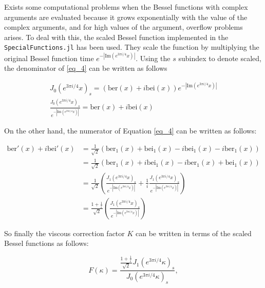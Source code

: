 \documentclass{article}[a4paper, 12pt]
\begin{document}
Exists some computational problems when the Bessel functions with complex arguments are evaluated because it grows exponentially with the value of the complex arguments, and for high values of the argument, overflow problems arises. To deal with this, the scaled Bessel function implemented in the \texttt{SpecialFunctions.jl} has been used. They scale the function by multiplying the original Bessel function time $e^{-\left\vert \mathrm{Im}(e^{3\pi i/4}x) \right\vert }$. Using the $s$ subindex to denote scaled, the denominator of \eqref{eq_4} can be written as follows 

\begin{equation}
    \begin{array}{l}
        {J_0(e^{3\pi i/4}x)_s = (\mathrm{ber}(x)+i \mathrm{bei}(x)) e^{-\left\vert \mathrm{Im}(e^{3\pi i/4}x) \right\vert }}\\[1.5ex]
        \displaystyle \frac{J_0(e^{3\pi i/4}x)_s}{e^{-\left\vert \mathrm{Im}(e^{3\pi i/4}x) \right\vert }} = \mathrm{ber}(x)+i \mathrm{bei}(x)
    \end{array}
\end{equation}

On the other hand, the numerator of Equation \eqref{eq_4} can be written as follows:

\begin{equation}
 \begin{aligned}
    \mathrm{ber}'(x) + i\mathrm{bei}'(x) &= \frac{1}{\sqrt{2}}(\mathrm{ber}_1(x)+\mathrm{bei}_1(x)-i\mathrm{bei}_1(x)-i\mathrm{ber}_1(x))\\[1.5ex]
    &= \frac{1}{\sqrt{2}}\left(\mathrm{ber}_1(x)+i\mathrm{bei}_1(x)-i\mathrm{ber}_1(x)+\mathrm{bei}_1(x)\right)\\[1.5ex]
    & = \frac{1}{\sqrt{2}}\left( \frac{J_1(e^{3\pi i/4}x)_s}{e^{-\left\vert \mathrm{Im}(e^{3\pi i/4}x) \right\vert }}+\frac{1}{i} \frac{J_1(e^{3\pi i/4}x)_s}{e^{-\left\vert \mathrm{Im}(e^{3\pi i/4}x) \right\vert }}\right)\\[1.5ex]
    &=\displaystyle \frac{1+\frac{1}{i}}{\sqrt{2}}\left( \frac{J_1(e^{3\pi i/4}x)_s}{e^{-\left\vert \mathrm{Im}(e^{3\pi i/4}x) \right\vert }}\right)
\end{aligned}
\end{equation}

So finally the viscous correction factor $K$ can be written in terms of the scaled Bessel functions as follows:

$$ F(\kappa) = \displaystyle \frac{\frac{1+\frac{1}{i}}{\sqrt{2}}J_1(e^{3\pi i/4}\kappa)_s}{J_0(e^{3\pi i/4}\kappa)_s}, $$
\end{document}
